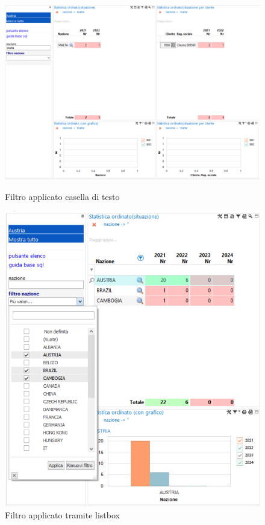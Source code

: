 \documentclass[target=bach,aauheader=,style=]{thud}
\begin{document}
\begin{figure}[H]
    \centering
    \begin{minipage}{0.45\textwidth}
        \centering
        \includegraphics[width=\linewidth, trim=0cm 0cm 15cm 0cm, clip]{quickvision/filtro.png}
        \caption{Filtro applicato casella di testo}
    \end{minipage}
    \hfill
    \begin{minipage}{0.45\textwidth}
        \centering
        \includegraphics[width=\linewidth]{quickvision/filtro list.png}
        \caption{Filtro applicato tramite listbox}
    \end{minipage}
\end{figure}
\end{document}
